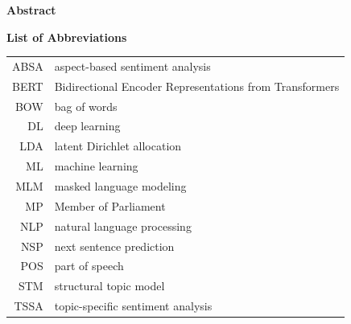 \documentclass[12pt]{article}
\begin{document}

\newpage

\Large
\noindent
\textbf{Abstract}
\vspace{0.5cm} \\
\noindent
\normalsize

\newpage

\tableofcontents
\newpage

\Large
\noindent
\textbf{List of Abbreviations}
\vspace{0.5cm} \\
\noindent
\normalsize

\begin{tabular}{rl}
  ABSA & aspect-based sentiment analysis \\
  BERT & Bidirectional Encoder Representations from Transformers \\ 
  BOW & bag of words \\
  DL & deep learning \\
  LDA & latent Dirichlet allocation \\
  ML & machine learning \\
  MLM & masked language modeling \\
  MP & Member of Parliament \\
  NLP & natural language processing \\
  NSP & next sentence prediction \\
  POS & part of speech \\
  STM & structural topic model \\
  TSSA & topic-specific sentiment analysis
\end{tabular}

% 
% 

\vspace{3cm}

\listoffigures

\vspace{3cm}

\listoftables

\newpage
\end{document}
